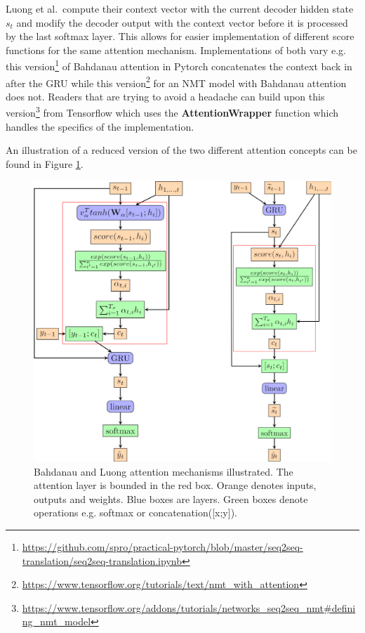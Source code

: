 \documentclass[]{krantz}
\renewcommand{\href}[2]{#2\footnote{\url{#1}}}
\begin{document}
Luong et al.~compute their context vector with the current decoder hidden state \(s_t\) and modify the decoder output with the
context vector before it is processed by the last softmax layer. This allows for easier implementation of different
score functions for the same attention mechanism. Implementations of both vary e.g. \href{https://github.com/spro/practical-pytorch/blob/master/seq2seq-translation/seq2seq-translation.ipynb}{this version} of Bahdanau attention in Pytorch concatenates the context back in after the GRU while \href{https://www.tensorflow.org/tutorials/text/nmt_with_attention}{this version} for an NMT model with Bahdanau attention does not. Readers that are trying to avoid a headache can build upon \href{https://www.tensorflow.org/addons/tutorials/networks_seq2seq_nmt\#defining_nmt_model}{this version} from Tensorflow which uses the \textbf{AttentionWrapper} function which handles the specifics of the implementation.

An illustration of a reduced version of the two different attention
concepts can be found in Figure \ref{fig:attention-mechanisms}.

\begin{figure}

{\centering \includegraphics[width=1\linewidth]{figures/02-02-attention-and-self-attention-for-nlp/bahdanau-luong-illustrated} 

}

\caption{Bahdanau and Luong attention mechanisms illustrated. The attention layer is bounded in the red box. Orange denotes inputs, outputs and weights. Blue boxes are layers. Green boxes denote operations e.g. softmax or concatenation([x;y]).}\label{fig:attention-mechanisms}
\end{figure}
\end{document}
